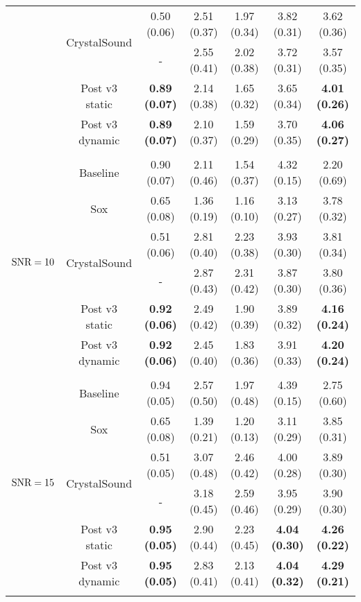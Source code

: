 \begin{table}[h]
\begin{tabular}{l c c c c c c}
				&\multirow{2}{*}{CrystalSound}   & 0.50 (0.06)   & 2.51 (0.37)   & 1.97 (0.34)   & 3.82 (0.31)   & 3.62 (0.36) \\
				&       &  -  & 2.55 (0.41)   & 2.02 (0.38)   & 3.72 (0.31)   & 3.57 (0.35) \\
				&Post v3 static & \textbf{0.89 (0.07)}   & 2.14 (0.38)   & 1.65 (0.32)   & 3.65 (0.34)   & \textbf{4.01 (0.26)} \\
				&Post v3 dynamic        & \textbf{0.89 (0.07)}   & 2.10 (0.37)   & 1.59 (0.29)   & 3.70 (0.35)   & \textbf{4.06 (0.27)} \\
				&&&&&&\\
				\multirow{6}{*}{$\text{SNR}=10$}        &Baseline       & 0.90 (0.07)   & 2.11 (0.46)   & 1.54 (0.37)   & 4.32 (0.15)  & 2.20 (0.69) \\
				&Sox    & 0.65 (0.08)   & 1.36 (0.19)   & 1.16 (0.10)   & 3.13 (0.27)   & 3.78 (0.32) \\
				&\multirow{2}{*}{CrystalSound}   & 0.51 (0.06)   & 2.81 (0.40)   & 2.23 (0.38)   & 3.93 (0.30)   & 3.81 (0.34) \\
				&       & -  & 2.87 (0.43)   & 2.31 (0.42)   & 3.87 (0.30)   & 3.80 (0.36) \\
				&Post v3 static & \textbf{0.92 (0.06)}   & 2.49 (0.42)   & 1.90 (0.39)   & 3.89 (0.32)   & \textbf{4.16 (0.24)} \\
				&Post v3 dynamic        & \textbf{0.92 (0.06)}   & 2.45 (0.40)   & 1.83 (0.36)   & 3.91 (0.33)   & \textbf{4.20 (0.24)} \\
				&&&&&&\\
				\multirow{6}{*}{$\text{SNR}=15$}        &Baseline       & 0.94 (0.05)   & 2.57 (0.50)   & 1.97 (0.48)   & 4.39 (0.15)  & 2.75 (0.60) \\
				&Sox    & 0.65 (0.08)   & 1.39 (0.21)   & 1.20 (0.13)   & 3.11 (0.29)   & 3.85 (0.31) \\
				&\multirow{2}{*}{CrystalSound}   & 0.51 (0.05)   & 3.07 (0.48)   & 2.46 (0.42)   & 4.00 (0.28)   & 3.89 (0.30) \\
				&       & -  & 3.18 (0.45)   & 2.59 (0.46)   & 3.95 (0.29)   & 3.90 (0.30) \\
				&Post v3 static & \textbf{0.95 (0.05)}   & 2.90 (0.44)   & 2.23 (0.45)   & \textbf{4.04 (0.30)}   & \textbf{4.26 (0.22)} \\
				&Post v3 dynamic        & \textbf{0.95 (0.05)}   & 2.83 (0.41)   & 2.13 (0.41)   & \textbf{4.04 (0.32)}   & \textbf{4.29 (0.21)} \\
				&&&&&&\\

\end{tabular}
\end{table}
